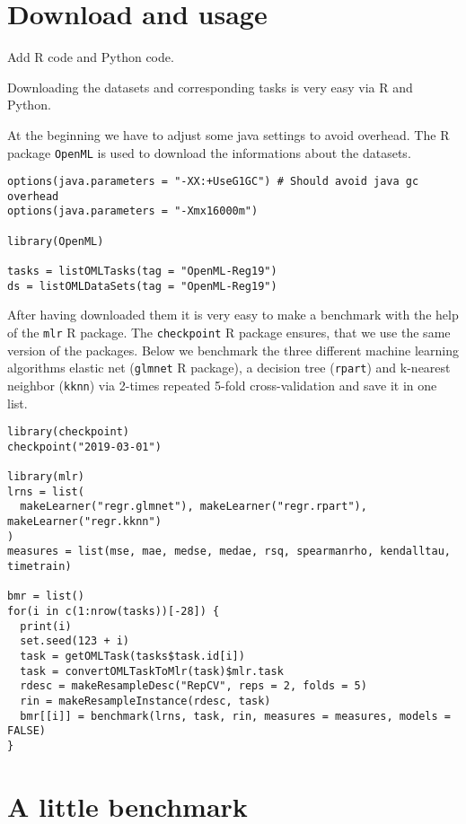 \documentclass[a4paper]{article}
\begin{document}
\section{Download and usage}

\color{red} Add R code and Python code. \color{black}

Downloading the datasets and corresponding tasks is very easy via R and Python. 

At the beginning we have to adjust some java settings to avoid overhead. The R package \texttt{OpenML} is used to download the informations about the datasets.

\begin{lstlisting}
options(java.parameters = "-XX:+UseG1GC") # Should avoid java gc overhead
options(java.parameters = "-Xmx16000m")

library(OpenML)

tasks = listOMLTasks(tag = "OpenML-Reg19")
ds = listOMLDataSets(tag = "OpenML-Reg19")
\end{lstlisting}

After having downloaded them it is very easy to make a benchmark with the help of the \texttt{mlr} R package. 
The \texttt{checkpoint} R package ensures, that we use the same version of the packages. 
Below we benchmark the three different machine learning algorithms elastic net (\texttt{glmnet} R package), a decision tree (\texttt{rpart}) and k-nearest neighbor (\texttt{kknn}) via 2-times repeated 5-fold cross-validation and save it in one list. 

\begin{lstlisting}
library(checkpoint)
checkpoint("2019-03-01")

library(mlr)
lrns = list(
  makeLearner("regr.glmnet"), makeLearner("regr.rpart"), makeLearner("regr.kknn")
) 
measures = list(mse, mae, medse, medae, rsq, spearmanrho, kendalltau, timetrain)

bmr = list()
for(i in c(1:nrow(tasks))[-28]) {
  print(i)
  set.seed(123 + i)
  task = getOMLTask(tasks$task.id[i])
  task = convertOMLTaskToMlr(task)$mlr.task
  rdesc = makeResampleDesc("RepCV", reps = 2, folds = 5)
  rin = makeResampleInstance(rdesc, task)
  bmr[[i]] = benchmark(lrns, task, rin, measures = measures, models = FALSE)
}
\end{lstlisting}


\section{A little benchmark}
\end{document}
